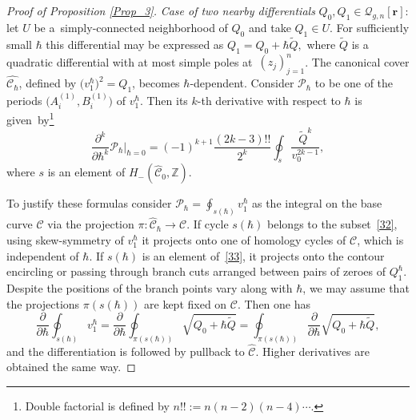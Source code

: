 \documentclass[10pt,a4paper]{article}
\numberwithin{equation}{section}
\theoremstyle{definition}
\newcommand{\Z}{\mathbb{Z}}
\begin{document}
\begin{proof}[Proof of Proposition \ref{Prop_3}]
\textit{Case of two nearby differentials} $Q_0, Q_1 \in \mathcal{Q}_{g,n}[\mathbf{r}] $: let $U$ be a~sim\-ply-connected neighborhood of $Q_0$ and take $Q_1 \in U.$ For sufficiently small $\hbar$ this differential may be expressed as $Q_1=Q_0+\hbar \tilde{Q},$ where $\tilde{Q}$ is a quadratic differential with at most simple poles at~$(z_j)^{n}_{j=1}$. The canonical cover $\hat{\mathcal{C}_\hbar}$, defined by $\big(v^\hbar_1\big)^2=Q_1$, becomes $\hbar$-dependent. Consider $\mathcal{P}_{\hbar}$ to be one of the periods $\big(A^{(1)}_i,B^{(1)}_i\big)$ of $v^\hbar_1$. Then its $k$-th derivative with respect to $\hbar$ is given~by\footnote{Double factorial is defined by $n!!:=n(n-2)(n-4)\cdots$.}
\begin{equation}\label{101}
\frac{\partial^k }{\partial \hbar^k}\mathcal{P}_{\hbar}\Big|_{\hbar=0} =
(-1)^{k+1}\frac{(2k-3)!!}{2^k}\oint_{s}\frac{\tilde{Q}^k}{v_{0}^{2k-1}},\end{equation}
where $s$ is an element of $H_{-}(\hat{\mathcal{C}}_0, \Z)$.

To justify these formulas consider $ \mathcal{P}_{\hbar}=\oint_{s(\hbar)}v^\hbar_{1}$ as the integral on the base curve $\mathcal{C}$ via the projection $\pi\colon \hat{\mathcal{C}}_\hbar \xrightarrow{} {\mathcal{C}}$. If cycle $s(\hbar)$ belongs to the subset~\eqref{32}, using skew-symmetry of $v^\hbar_1$ it projects onto one of homology cycles of $\mathcal{C}$, which is independent of $\hbar$. If $s(\hbar)$ is an element of~\eqref{33}, it projects onto the contour encircling or passing through branch cuts arranged between pairs of zeroes of $Q^\hbar_{1}$. Despite the positions of the branch points vary along with $\hbar$, we may assume that the projections $\pi(s(\hbar))$ are kept fixed on $\mathcal{C}$. Then one has
\begin{equation*}%
\frac{\partial}{\partial \hbar}\oint_{s(\hbar)}v^\hbar_{1}=\frac{\partial}{\partial \hbar}\oint_{\pi(s(\hbar))}\sqrt{Q_0+\hbar \tilde{Q}}= \oint_{\pi(s(\hbar))}\frac{\partial}{\partial \hbar}\sqrt{Q_0+\hbar\tilde{Q}},
\end{equation*}
and the differentiation is followed by pullback to $\hat{\mathcal{C}}$. Higher derivatives are obtained the same way.


\end{proof}
\end{document}
